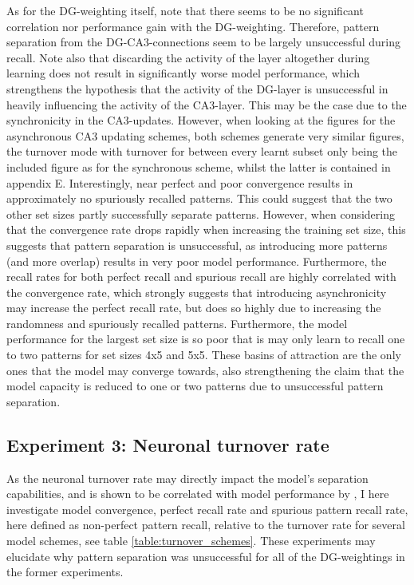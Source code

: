 As for the DG-weighting itself, note that there seems to be no significant correlation nor performance gain with the DG-weighting. Therefore, pattern separation from the DG-CA3-connections seem to be largely unsuccessful during recall.
Note also that discarding the activity of the layer altogether during learning does not result in significantly worse model performance, which strengthens the hypothesis that the activity of the DG-layer is unsuccessful in heavily influencing the activity of the CA3-layer. 
This may be the case due to the synchronicity in the CA3-updates. 
However, when looking at the figures for the asynchronous CA3 updating schemes, both schemes generate very similar figures, the turnover mode with turnover for between every learnt subset only being the included figure as for the synchronous scheme, whilst the latter is contained in appendix E.
Interestingly, near perfect and poor convergence results in approximately no spuriously recalled patterns. This could suggest that the two other set sizes partly successfully separate patterns. However, when considering that the convergence rate drops rapidly when increasing the training set size, this suggests that pattern separation is unsuccessful, as introducing more patterns (and more overlap) results in very poor model performance. Furthermore, the recall rates for both perfect recall and spurious recall are highly correlated with the convergence rate, which strongly suggests that introducing asynchronicity may increase the perfect recall rate, but does so highly due to increasing the randomness and spuriously recalled patterns. Furthermore, the model performance for the largest set size is so poor that is may only learn to recall one to two patterns for set sizes 4x5 and 5x5. These basins of attraction are the only ones that the model may converge towards, also strengthening the claim that the model capacity is reduced to one or two patterns due to unsuccessful pattern separation.


\subsection{Experiment 3: Neuronal turnover rate}

As the neuronal turnover rate may directly impact the model's separation capabilities, and is shown to be correlated with model performance by \citep{Hattori2014}, I here investigate model convergence, perfect recall rate and spurious pattern recall rate, here defined as non-perfect pattern recall, relative to the turnover rate for several model schemes, see table \ref{table:turnover_schemes}. These experiments may elucidate why pattern separation was unsuccessful for all of the DG-weightings in the former experiments.

